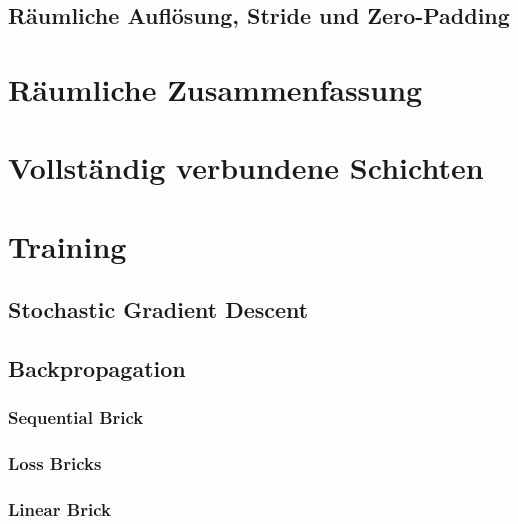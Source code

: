 		\subsection{Räumliche Auflösung, Stride und Zero-Padding} %

	\section{Räumliche Zusammenfassung} %

	\section{Vollständig verbundene Schichten} %

	\section{Training} %

		\subsection{Stochastic Gradient Descent} %

		\subsection{Backpropagation} %

			\subsubsection{Sequential Brick} %

			\subsubsection{Loss Bricks} %

			\subsubsection{Linear Brick} %

